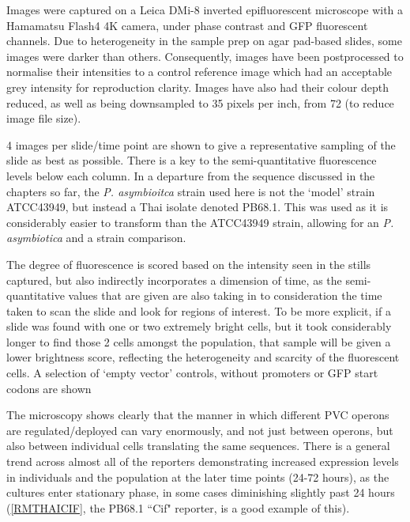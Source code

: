 Images were captured on a Leica DMi-8 inverted epifluorescent microscope with a Hamamatsu Flash4 4K camera, under phase contrast and GFP fluorescent channels. Due to heterogeneity in the sample prep on agar pad-based slides, some images were darker than others. Consequently, images have been postprocessed to normalise their intensities to a control reference image which had an acceptable grey intensity for reproduction clarity. Images have also had their colour depth reduced, as well as being downsampled to 35 pixels per inch, from 72 (to reduce image file size).

4 images per slide/time point are shown to give a representative sampling of the slide as best as possible. There is a key to the semi-quantitative fluorescence levels below each column. In a departure from the sequence discussed in the chapters so far, the \emph{P. asymbioitca} strain used here is not the `model' strain ATCC43949, but instead a Thai isolate denoted PB68.1. This was used as it is considerably easier to transform than the ATCC43949 strain, allowing for an \emph{P. asymbiotica} and a \Plum{} strain comparison.

The degree of fluorescence is scored based on the intensity seen in the stills captured, but also indirectly incorporates a dimension of time, as the semi-quantitative values that are given are also taking in to consideration the time taken to scan the slide and look for regions of interest. To be more explicit, if a slide was found with one or two extremely bright cells, but it took considerably longer to find those 2 cells amongst the population, that sample will be given a lower brightness score, reflecting the heterogeneity and scarcity of the fluorescent cells. A selection of `empty vector' controls, without promoters or GFP start codons are shown  


\clearpage

The microscopy shows clearly that the manner in which different PVC operons are regulated/deployed can vary enormously, and not just between operons, but also between individual cells translating the same sequences. There is a general trend across almost all of the reporters demonstrating increased expression levels in individuals and the population at the later time points (24-72 hours), as the cultures enter stationary phase, in some cases diminishing slightly past 24 hours (\vref{RMTHAICIF}, the PB68.1 ``Cif" reporter, is a good example of this).

